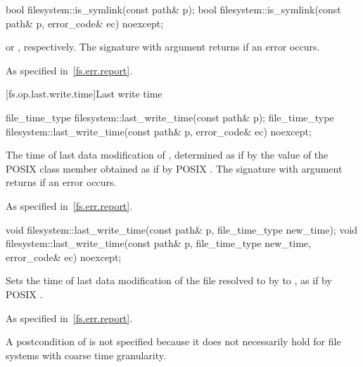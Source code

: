 %
\begin{itemdecl}
bool filesystem::is_symlink(const path& p);
bool filesystem::is_symlink(const path& p, error_code& ec) noexcept;
\end{itemdecl}

\begin{itemdescr}
\pnum
\returns
{} or ,
  respectively. The signature with argument  returns 
  if an error occurs.

\pnum
\throws
As specified in~\ref{fs.err.report}.
\end{itemdescr}


[fs.op.last.write.time]{Last write time}

%
\begin{itemdecl}
file_time_type filesystem::last_write_time(const path& p);
file_time_type filesystem::last_write_time(const path& p, error_code& ec) noexcept;
\end{itemdecl}

\begin{itemdescr}
\pnum
\returns
The time of last data modification of ,
  determined as if by the value of the POSIX  class member 
  obtained as if by POSIX .
  The signature with argument  returns 
  if an error occurs.

\pnum
\throws
As specified in~\ref{fs.err.report}.
\end{itemdescr}

%
\begin{itemdecl}
void filesystem::last_write_time(const path& p, file_time_type new_time);
void filesystem::last_write_time(const path& p, file_time_type new_time,
                     error_code& ec) noexcept;
\end{itemdecl}

\begin{itemdescr}
\pnum
\effects
Sets the time of last data modification of the file
  resolved to by  to , as if by POSIX .

\pnum
\throws
As specified in~\ref{fs.err.report}.

\pnum
\begin{note}
A postcondition of  is not specified
because it does not necessarily hold for file systems with coarse time granularity.
\end{note}
\end{itemdescr}


